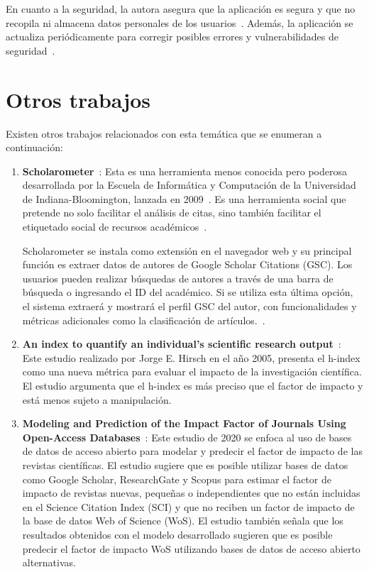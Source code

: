 En cuanto a la seguridad, la autora asegura que la aplicación es segura y que no recopila ni almacena datos personales de los usuarios~\cite{harzing2010}. Además, la aplicación se actualiza periódicamente para corregir posibles errores y vulnerabilidades de seguridad~\cite{pop2007}.





\section{Otros trabajos}

Existen otros trabajos relacionados con esta temática que se enumeran a continuación:

\begin{enumerate} 

  \item \textbf{Scholarometer}~\cite{scholarometer2018}:  Esta es una herramienta menos conocida pero poderosa desarrollada por la Escuela de Informática y Computación de la Universidad de Indiana-Bloomington, lanzada en 2009~\cite{kaur2012}. Es una herramienta social que pretende no solo facilitar el análisis de citas, sino también facilitar el etiquetado social de recursos académicos~\cite{lopez2017}.
  
  Scholarometer se instala como extensión en el navegador web y su principal función es extraer datos de autores de Google Scholar Citations (GSC). Los usuarios pueden realizar búsquedas de autores a través de una barra de búsqueda o ingresando el ID del académico. Si se utiliza esta última opción, el sistema extraerá y mostrará el perfil GSC del autor, con funcionalidades y métricas adicionales como la clasificación de artículos.~\cite{lopez2017}.
  

  \item \textbf{An index to quantify an individual's scientific research output}~\cite{hirsch2005}:  Este estudio realizado por Jorge E. Hirsch en el año 2005, presenta el h-index como una nueva métrica para evaluar el impacto de la investigación científica. El estudio argumenta que el h-index es más preciso que el factor de impacto y está menos sujeto a manipulación.


  \item \textbf{Modeling and Prediction of the Impact Factor of Journals Using Open-Access Databases}~\cite{templ2020}: Este estudio de 2020 se enfoca al uso de bases de datos de acceso abierto para modelar y predecir el factor de impacto de las revistas científicas. El estudio sugiere que es posible utilizar bases de datos como Google Scholar, ResearchGate y Scopus para estimar el factor de impacto de revistas nuevas, pequeñas o independientes que no están incluidas en el Science Citation Index (SCI) y que no reciben un factor de impacto de la base de datos Web of Science (WoS). El estudio también señala que los resultados obtenidos con el modelo desarrollado sugieren que es posible predecir el factor de impacto WoS utilizando bases de datos de acceso abierto alternativas.
  
\end{enumerate}


